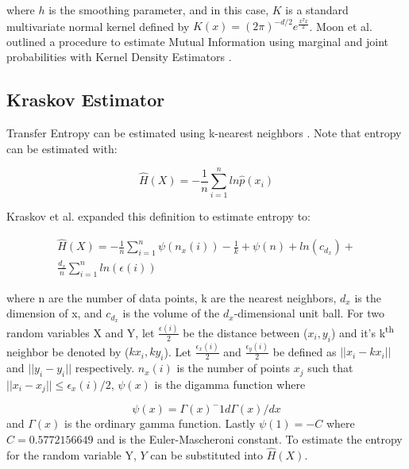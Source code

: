 \documentclass[conference]{IEEEtran}
\begin{document}
\noindent where \(h\) is the smoothing parameter, and in this case, \(K\) is a standard multivariate normal kernel defined by \(K(x)=(2\pi)^{-d/2} e^{\frac{x^Tx}{2} } \). Moon et al. outlined a procedure to estimate Mutual Information using marginal and joint probabilities with Kernel Density Estimators \cite{KDE}.

\subsection{Kraskov Estimator}

Transfer Entropy can be estimated using k-nearest neighbors \cite{kraskovEstimator}. Note that entropy can be estimated with:

\begin{equation}\hat{H}(X) = - \frac{1}{n} \sum^n_{i=1} ln \hat{p}(x_i) \end{equation}

\noindent Kraskov et al. expanded this definition to estimate entropy to:

\setlength{\arraycolsep}{0.0em}
\begin{eqnarray}
\hat{H}(X) = - \frac{1}{n} \sum^n_{i=1} \psi(n_x(i)) - \frac{1}{k} + \psi(n) + ln (c_{d_x}) + \nonumber\\
 \frac{d_x}{n} \sum^n_{i=1} ln (\epsilon(i))
\end{eqnarray}
\setlength{\arraycolsep}{1pt}

\noindent where n are the number of data points, k are the nearest neighbors, \(d_x\) is the dimension of x, and \(c_{d_x}\) is the volume of the \(d_x\)-dimensional unit ball. For two random variables X and Y, let \( \frac{\epsilon(i)}{2} \) be the distance between (\(x_i,y_i\)) and it's k\textsuperscript{th} neighbor be denoted by (\(kx_i,ky_i\)). Let \(\frac{\epsilon_x(i)}{2}\) and  \(\frac{\epsilon_y(i)}{2}\) be defined as \( ||x_i-kx_i ||\) and \( ||y_i-y_i || \) respectively. \(n_x(i)\) is the number of points \(x_j\) such that \(||x_i - x_j  || \leq \epsilon_x(i)/2\), \(\psi(x)\) is the digamma function where

\begin{equation}\psi(x) = \Gamma(x)^-1 d\Gamma(x) / dx \end{equation}
and  \(\Gamma(x)\) is the ordinary gamma function. Lastly \(\psi(1) = -C\) where \(C=0.5772156649\) and is the Euler-Mascheroni constant. To estimate the entropy for the random variable Y, \(Y\) can be substituted into \(\hat{H}(X)\).
\end{document}
